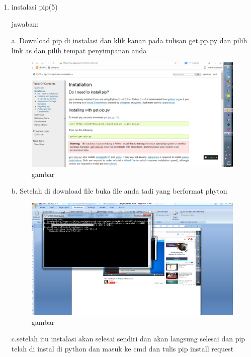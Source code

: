 \begin{enumerate}
\item

 


instalasi pip(5)

jawaban:

a.	Download pip di instalasi dan klik kanan pada tulisan get.pp.py dan pilih link as dan pilih tempat penyimpanan anda

\begin{figure}
\begin{center} 
\includegraphics[scale=0.4]{src/soal2phyton1.PNG} 
\caption{gambar} 
\label{unhas} 
\end{center} 
\end{figure}

b.	Setelah di download file buka file anda tadi yang berformat phyton

\begin{figure}
\begin{center} 
\includegraphics[scale=0.4]{src/soal2phyton2.PNG} 
\caption{gambar} 
\label{unhas} 
\end{center} 
\end{figure}

c.setelah itu instalasi akan selesai sendiri dan akan langsung selesai dan pip telah di instal di python dan masuk ke cmd dan tulis pip install request


\end{enumerate}
